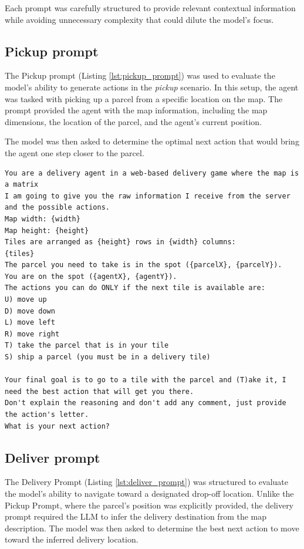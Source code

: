Each prompt was carefully structured to provide relevant contextual information while
avoiding unnecessary complexity that could dilute the model's focus.

\subsection{Pickup prompt}
\label{sub:pickup_prompt}

The Pickup prompt (Listing \ref{lst:pickup_prompt}) was used to evaluate the
model's ability to generate actions in the \emph{pickup} scenario. In this setup,
the agent was tasked with picking up a parcel from a specific location on the map.
The prompt provided the agent with the map information, including the map dimensions,
the location of the parcel, and the agent's current position.

The model was then asked to determine the optimal next action that would bring the
agent one step closer to the parcel.

\begin{codewindow}
  [Text]  \begin{lstlisting}
You are a delivery agent in a web-based delivery game where the map is a matrix
I am going to give you the raw information I receive from the server and the possible actions.
Map width: {width}
Map height: {height}
Tiles are arranged as {height} rows in {width} columns:
{tiles}
The parcel you need to take is in the spot ({parcelX}, {parcelY}).
You are on the spot ({agentX}, {agentY}).
The actions you can do ONLY if the next tile is available are:
U) move up
D) move down
L) move left
R) move right
T) take the parcel that is in your tile
S) ship a parcel (you must be in a delivery tile)

Your final goal is to go to a tile with the parcel and (T)ake it, I need the best action that will get you there.
Don't explain the reasoning and don't add any comment, just provide the action's letter.
What is your next action?
\end{lstlisting}
\end{codewindow}

\subsection{Deliver prompt}
\label{sub:deliver_prompt}

The Delivery Prompt (Listing \ref{lst:deliver_prompt}) was structured to evaluate
the model's ability to navigate toward a designated drop-off location. Unlike
the Pickup Prompt, where the parcel's position was explicitly provided, the
delivery prompt required the LLM to infer the delivery destination from the map
description. The model was then asked to determine the best next action to move toward
the inferred delivery location.

